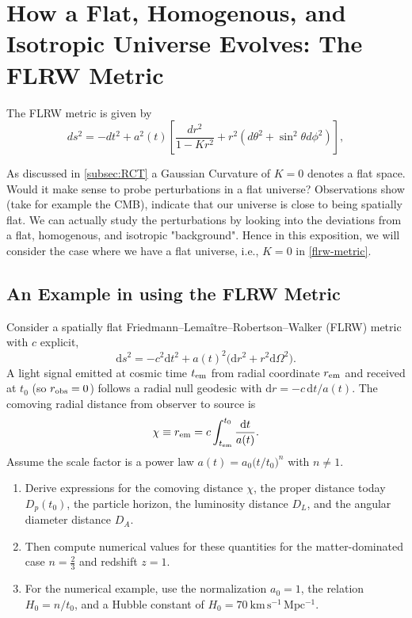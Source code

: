 \documentclass[a4paper,11pt]{article}
\begin{document}
\section{How a Flat, Homogenous, and Isotropic Universe Evolves: The FLRW Metric}


The FLRW metric is given by 
\begin{equation}
    ds^2 = -dt^2 + a^2(t) \left[ \frac{dr^2}{1-Kr^2} + r^2 (d\theta^2 + \sin^2 \theta d\phi^2) \right],
    \label{flrw-metric}
\end{equation}





As discussed in \ref{subsec:RCT} a Gaussian Curvature of $K=0$ denotes a flat space. Would it make sense
to probe perturbations in a flat universe? Observations show (take for example the CMB), indicate
that our universe is close to being spatially flat. We can actually study the perturbations by 
looking into the deviations from a flat, homogenous, and isotropic "background". Hence in this exposition,
we will consider the case where we have a flat universe, i.e., $K=0$ in \cref{flrw-metric}.



\subsection{An Example in using the FLRW Metric}

Consider a spatially flat Friedmann–Lemaître–Robertson–Walker (FLRW) metric with $c$ explicit,
$$ \mathrm{d}s^2 = -c^2\mathrm{d}t^2 + a(t)^2\bigl(\mathrm{d}r^2 + r^2\mathrm{d}\Omega^2\bigr). $$
A light signal emitted at cosmic time $t_{\rm em}$ from radial coordinate $r_{\rm em}$ and received at $t_0$ (so $r_{\rm obs}=0$) follows a radial null geodesic with $\mathrm{d}r = -c\,\mathrm{d}t/a(t)$. The comoving radial distance from observer to source is
$$ \chi \equiv r_{\rm em} = c\int_{t_{\rm em}}^{t_0}\frac{\mathrm{d}t}{a(t)}. $$
Assume the scale factor is a power law $a(t)=a_0\bigl(t/t_0\bigr)^n$ with $n\neq 1$.

\vspace{1em} %
\begin{enumerate}
    \item Derive expressions for the comoving distance $\chi$, the proper distance today $D_{p}(t_0)$, the particle horizon, the luminosity distance $D_L$, and the angular diameter distance $D_A$.
    
    \item Then compute numerical values for these quantities for the matter-dominated case $n=\tfrac{2}{3}$ and redshift $z=1$.
    
    \item For the numerical example, use the normalization $a_0=1$, the relation $H_0=n/t_0$, and a Hubble constant of $H_0=70\ \mathrm{km\,s^{-1}\,Mpc^{-1}}$.
\end{enumerate}
\end{document}
